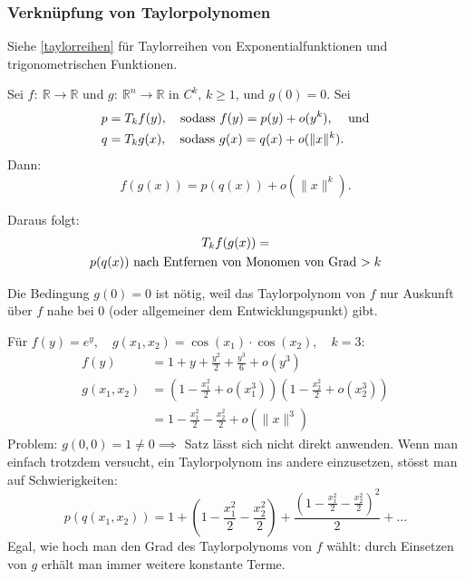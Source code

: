 \documentclass[a4paper,10pt]{article}
\def\R{\mathbb{R}}
\begin{document}
\subsubsection{Verknüpfung von Taylorpolynomen}

Siehe \ref{taylorreihen} für Taylorreihen von Exponentialfunktionen und trigonometrischen Funktionen.


\begin{subbox}{}
    Sei \( f: \: \R \to \R \) und \( g: \: \R^n \to \R \) in \( C^k, \, k \geq 1 \), und \( g(0) = 0 \). Sei \begin{align*}
        p &= T_k f(y), \quad \text{sodass } f(y) = p(y) + o(y^k) \text{, \quad und} \\
        q &= T_k g(x), \quad \text{sodass } g(x) = q(x) + o(\| x \|^k) \text{.}
    \end{align*}
    Dann:
    \[
        f(g(x)) = p(q(x)) + o(\| x \|^k) \text{.}
    \]
\end{subbox}

Daraus folgt:
\begin{multline*}
    T_k f(g(x)) = \\
    \text{\( p(q(x)) \) nach Entfernen von Monomen von Grad \( > k \)}
\end{multline*}

Die Bedingung \( g(0) = 0 \) ist nötig, weil das Taylorpolynom von \( f \) nur Auskunft über \( f \) nahe bei \( 0 \) (oder allgemeiner dem Entwicklungspunkt) gibt.

Für \( f(y) = e^y, \quad g(x_1, x_2) = \cos(x_1) \cdot \cos(x_2), \quad k = 3 \):
\begin{align*}
    f(y) &= 1 + y + \frac{y^2}{2} + \frac{y^3}{6} + o(y^3) \\
    g(x_1, x_2) &= \left( 1 - \frac{x_1^2}{2} + o(x_1^3) \right) \left( 1 - \frac{x_2^2}{2} + o(x_2^3) \right) \\
        &= 1 - \frac{x_1^2}{2} - \frac{x_2^2}{2} + o(\| x \|^3)
\end{align*}
Problem: \( g(0, 0) = 1 \neq 0 \implies \) Satz lässt sich nicht direkt anwenden. Wenn man einfach trotzdem versucht, ein Taylorpolynom ins andere einzusetzen, stösst man auf Schwierigkeiten:
\[
    p(q(x_1, x_2)) = 1 + \left( 1 - \frac{x_1^2}{2} - \frac{x_2^2}{2} \right) + \frac{\left( 1 - \frac{x_1^2}{2} - \frac{x_2^2}{2} \right)^2}{2} + \dots
\]
Egal, wie hoch man den Grad des Taylorpolynoms von \( f \) wählt: durch Einsetzen von \( g \) erhält man immer weitere konstante Terme.
\end{document}
